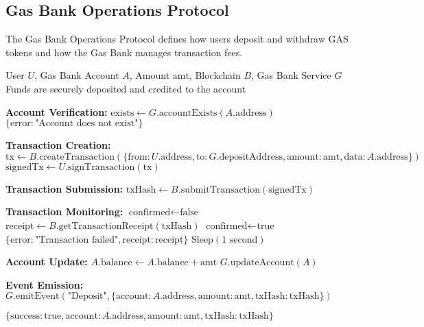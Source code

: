 \subsection{Gas Bank Operations Protocol}
\label{subsec:gas-bank-protocol}

The Gas Bank Operations Protocol defines how users deposit and withdraw GAS tokens and how the Gas Bank manages transaction fees.

\begin{protocol}
\label{prot:gas-bank-deposit}
\begin{algorithmic}[1]
\Require User $U$, Gas Bank Account $A$, Amount $\text{amt}$, Blockchain $B$, Gas Bank Service $G$
\Ensure Funds are securely deposited and credited to the account

\State \textbf{Account Verification:}
\State $\text{exists} \gets G.\text{accountExists}(A.\text{address})$
    \State \Return $\{\text{error}: \text{"Account does not exist"}\}$
\EndIf

\State \textbf{Transaction Creation:}
\State $\text{tx} \gets B.\text{createTransaction}(\{\text{from}: U.\text{address}, \text{to}: G.\text{depositAddress}, \text{amount}: \text{amt}, \text{data}: A.\text{address}\})$
\State $\text{signedTx} \gets U.\text{signTransaction}(\text{tx})$

\State \textbf{Transaction Submission:}
\State $\text{txHash} \gets B.\text{submitTransaction}(\text{signedTx})$

\State \textbf{Transaction Monitoring:}
\State $\text{confirmed} \gets \text{false}$
    \State $\text{receipt} \gets B.\text{getTransactionReceipt}(\text{txHash})$
            \State $\text{confirmed} \gets \text{true}$
            \State \Return $\{\text{error}: \text{"Transaction failed"}, \text{receipt}: \text{receipt}\}$
        \EndIf
    \EndIf
        \State $\text{Sleep}(1\text{ second})$
    \EndIf
\EndWhile

\State \textbf{Account Update:}
\State $A.\text{balance} \gets A.\text{balance} + \text{amt}$
\State $G.\text{updateAccount}(A)$

\State \textbf{Event Emission:}
\State $G.\text{emitEvent}(\text{"Deposit"}, \{\text{account}: A.\text{address}, \text{amount}: \text{amt}, \text{txHash}: \text{txHash}\})$

\State \Return $\{\text{success}: \text{true}, \text{account}: A.\text{address}, \text{amount}: \text{amt}, \text{txHash}: \text{txHash}\}$
\end{algorithmic}
\end{protocol}

